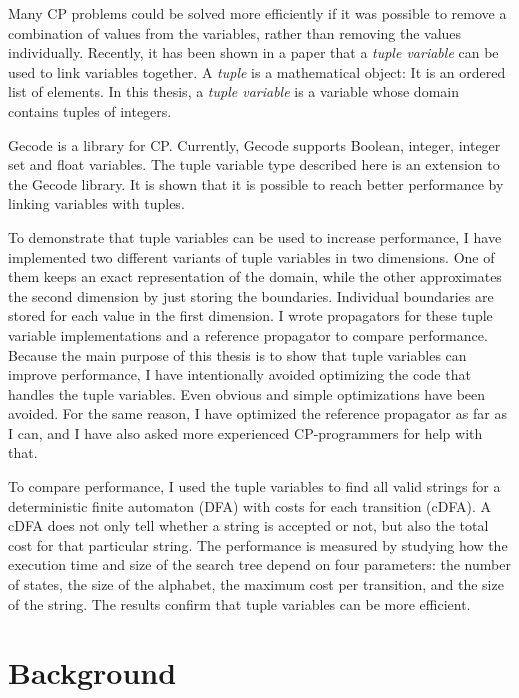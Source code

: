 \documentclass[a4paper,11pt]{article}
\begin{document}
Many CP problems could be solved more efficiently if it was possible to remove a combination of values from the variables, rather than removing the values individually. Recently, it has been shown in a paper \cite{Monette771427} that a \textit{tuple variable} can be used to link variables together. A \textit{tuple} is a mathematical object: It is an ordered list of elements. In this thesis, a \textit{tuple variable} is a variable whose domain contains tuples of integers. 

Gecode is a library for CP. Currently, Gecode supports Boolean, integer, integer set and float variables. The tuple variable type described here is an extension to the Gecode library. It is shown that it is possible to reach better performance by linking variables with tuples.

To demonstrate that tuple variables can be used to increase performance, I have implemented two different variants of tuple variables in two dimensions. One of them keeps an exact representation of the domain, while the other approximates the second dimension by just storing the boundaries. Individual boundaries are stored for each value in the first dimension. I wrote propagators for these tuple variable implementations and a reference propagator to compare performance. Because the main purpose of this thesis is to show that tuple variables can improve performance, I have intentionally avoided optimizing the code that handles the tuple variables. Even obvious and simple optimizations have been avoided. For the same reason, I have optimized the reference propagator as far as I can, and I have also asked more experienced CP-programmers for help with that.

To compare performance, I used the tuple variables to find all valid strings for a deterministic finite automaton (DFA) with costs for each transition (cDFA). A cDFA does not only tell whether a string is accepted or not, but also the total cost for that particular string. The performance is measured by studying how the execution time and size of the search tree depend on four parameters: the number of states, the size of the alphabet, the maximum cost per transition, and the size of the string. The results confirm that tuple variables can be more efficient.

\section{Background}
\end{document}
